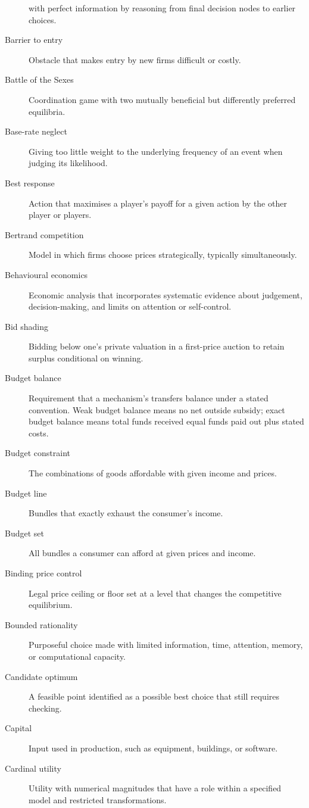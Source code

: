 \begin{description}
  with perfect information by reasoning from final decision nodes to earlier
  choices.
  \item[Barrier to entry] Obstacle that makes entry by new firms difficult or costly.
  \item[Battle of the Sexes] Coordination game with two mutually beneficial but differently preferred equilibria.
  \item[Base-rate neglect] Giving too little weight to the underlying frequency of an event when judging its likelihood.
  \item[Best response] Action that maximises a player's payoff for a given action by the other player or players.
  \item[Bertrand competition] Model in which firms choose prices strategically, typically simultaneously.
  \item[Behavioural economics] Economic analysis that incorporates systematic evidence about judgement, decision-making, and limits on attention or self-control.
  \item[Bid shading] Bidding below one's private valuation in a first-price auction to retain surplus conditional on winning.
  \item[Budget balance] Requirement that a mechanism's transfers balance under
  a stated convention. Weak budget balance means no net outside subsidy; exact
  budget balance means total funds received equal funds paid out plus stated
  costs.
  \item[Budget constraint] The combinations of goods affordable with given income and prices.
  \item[Budget line] Bundles that exactly exhaust the consumer's income.
  \item[Budget set] All bundles a consumer can afford at given prices and income.
  \item[Binding price control] Legal price ceiling or floor set at a level that changes the competitive equilibrium.
  \item[Bounded rationality] Purposeful choice made with limited information, time, attention, memory, or computational capacity.
  \item[Candidate optimum] A feasible point identified as a possible best choice that still requires checking.
  \item[Capital] Input used in production, such as equipment, buildings, or software.
  \item[Cardinal utility] Utility with numerical magnitudes that have a role within a specified model and restricted transformations.

\end{description}

